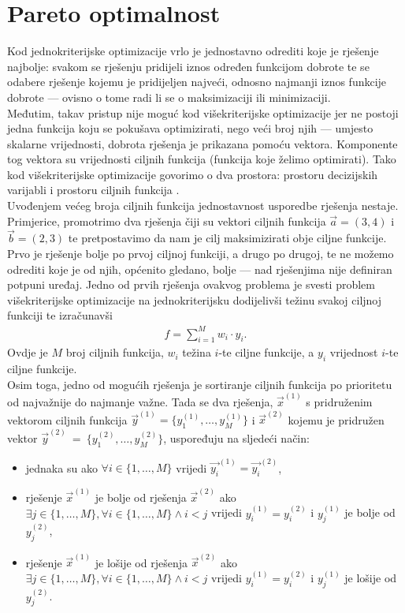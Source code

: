\documentclass[times, utf8, zavrsni, numeric]{fer}
\begin{document}
\section{Pareto optimalnost}
Kod jednokriterijske optimizacije vrlo je jednostavno odrediti koje je rješenje najbolje: svakom se rješenju pridijeli iznos određen funkcijom dobrote  te se odabere rješenje kojemu je pridijeljen najveći, odnosno najmanji iznos funkcije dobrote --- ovisno o tome radi li se o maksimizaciji ili minimizaciji.\\
Međutim, takav pristup nije moguć kod višekriterijske optimizacije jer ne postoji jedna funkcija koju se pokušava optimizirati, nego veći broj njih --- umjesto skalarne vrijednosti, dobrota rješenja je prikazana pomoću vektora. Komponente tog vektora su vrijednosti ciljnih funkcija (funkcija koje želimo optimirati). Tako kod višekriterijske optimizacije govorimo o dva prostora: prostoru decizijskih varijabli  i prostoru ciljnih funkcija . \\
Uvođenjem većeg broja ciljnih funkcija jednostavnost usporedbe rješenja nestaje. Primjerice, promotrimo dva rješenja čiji su vektori ciljnih funkcija $\vec{a} = (3,4)$ i $\vec{b} = (2,3)$ te pretpostavimo da nam je cilj maksimizirati obje ciljne funkcije. Prvo je rješenje bolje po prvoj ciljnoj funkciji, a drugo po drugoj, te ne možemo odrediti koje je od njih, općenito gledano, bolje --- nad rješenjima nije definiran potpuni uređaj. Jedno od prvih rješenja ovakvog problema je svesti problem višekriterijske optimizacije na jednokriterijsku dodijelivši težinu svakoj ciljnoj funkciji te izračunavši  
\begin{align*}
f = \sum_{i=1}^M w_i \cdot y_i.
\end{align*}
Ovdje je $M$ broj ciljnih funkcija, $w_i$ težina $i$-te ciljne funkcije, a $y_i$ vrijednost $i$-te ciljne funkcije. \\
Osim toga, jedno od mogućih rješenja je sortiranje ciljnih funkcija po prioritetu od najvažnije do najmanje važne. Tada se dva rješenja, $\vec{x}^{(1)}$ s pridruženim vektorom ciljnih funkcija $\vec{y}^{(1)} = \{y_1^{(1)}, \dots, y_M^{(1)}\}$ i $\vec{x}^{(2)}$ kojemu je pridružen vektor $\vec{y}^{(2)}~ = ~\{y_1^{(2)}, \dots, y_M^{(2)}\}$, uspoređuju na sljedeći način:
\begin{itemize}
\item jednaka su ako $\forall i \in \{1,\dots, M\}$ vrijedi $\vec{y_i}^{(1)} = \vec{y_i}^{(2)}$,
\item rješenje $\vec{x}^{(1)}$ je bolje od rješenja $\vec{x}^{(2)}$ ako $\exists j \in \{1,\dots,M\}, \forall i \in \{1,\dots,M\} \land i < j$ vrijedi $y_i^{(1)} = y_i^{(2)}$ i $y_j^{(1)}$ je bolje od $y_j^{(2)}$,
\item rješenje $\vec{x}^{(1)}$ je lošije od rješenja $\vec{x}^{(2)}$ ako $\exists j \in \{1,\dots,M\}, \forall i \in \{1,\dots,M\} \land i < j$ vrijedi $y_i^{(1)} = y_i^{(2)}$ i $y_j^{(1)}$ je lošije od $y_j^{(2)}$.
\end{itemize}
\end{document}
